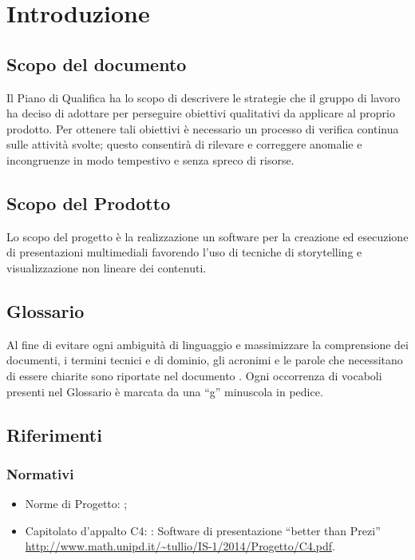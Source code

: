 \section{Introduzione}
\subsection{Scopo del documento}
Il Piano di Qualifica ha lo scopo di descrivere le strategie che il gruppo di lavoro ha deciso di adottare per perseguire obiettivi qualitativi da applicare al proprio prodotto. Per ottenere tali obiettivi è necessario un processo di verifica continua sulle attività svolte; questo consentirà di rilevare e correggere anomalie e incongruenze in modo tempestivo e senza spreco di risorse.
\subsection{Scopo del Prodotto}
Lo scopo del progetto è la realizzazione un software per la creazione ed esecuzione di presentazioni multimediali favorendo l’uso di tecniche di storytelling e visualizzazione non lineare dei contenuti.
\subsection{Glossario}
Al fine di evitare ogni ambiguità di linguaggio e massimizzare la comprensione dei documenti, i termini tecnici e di dominio, gli acronimi e le parole che necessitano di essere chiarite sono riportate nel documento \href{run:../../Esterni/\fGlossario}{\fEscapeGlossario}. Ogni occorrenza di vocaboli presenti nel Glossario è marcata da una “g” minuscola in pedice.
\subsection{Riferimenti}

\subsubsection{Normativi}
\begin{itemize}
\item Norme di Progetto: \href{run:../../Interni/\fNormeDiProgetto}{\fEscapeNormeDiProgetto};
\item Capitolato d’appalto C4: \premi: Software di presentazione “better than Prezi” \\
\url{http://www.math.unipd.it/~tullio/IS-1/2014/Progetto/C4.pdf}.
\end{itemize}
